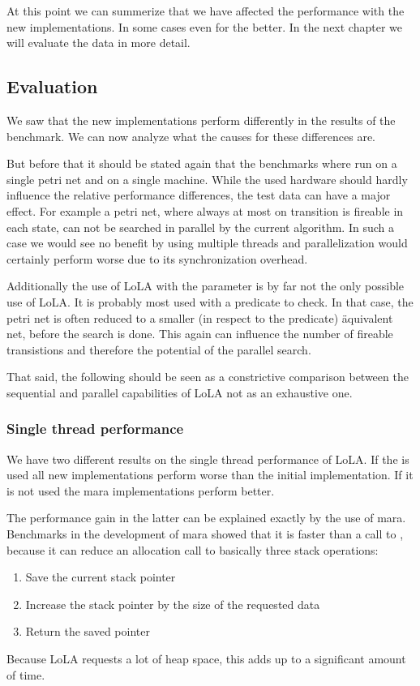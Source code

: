 At this point we can summerize that we have affected the performance with the new implementations. In some cases even for the better. In the next chapter we will evaluate the data in more detail.

\subsection{Evaluation}
\label{evaluation}
We saw that the new implementations perform differently in the results of the benchmark. We can now analyze what the causes for these differences are.

But before that it should be stated again that the benchmarks where run on a single petri net and on a single machine. While the used hardware should hardly influence the relative performance differences, the test data can have a major effect. For example a petri net, where always at most on transition is fireable in each state, can not be searched in parallel by the current algorithm. In such a case we would see no benefit by using multiple threads and parallelization would certainly perform worse due to its synchronization overhead.

Additionally the use of LoLA with the  parameter is by far not the only possible use of LoLA. It is probably most used with a predicate to check. In that case, the petri net is often reduced to a smaller (in respect to the predicate) äquivalent net, before the search is done. This again can influence the number of fireable transistions and therefore the potential of the parallel search.

That said, the following should be seen as a constrictive comparison between the sequential and parallel capabilities of LoLA not as an exhaustive one.

\subsubsection{Single thread performance}
\label{evalSingleThread}
We have two different results on the single thread performance of LoLA. If the  is used all new implementations perform worse than the initial implementation. If it is not used the mara implementations perform better.

The performance gain in the latter can be explained exactly by the use of mara. Benchmarks in the development of mara showed that it is faster than a call to , because it can reduce an allocation call to basically three stack operations:
\begin{enumerate}
    \item Save the current stack pointer
    \item Increase the stack pointer by the size of the requested data
    \item Return the saved pointer
\end{enumerate}
Because LoLA requests a lot of heap space, this adds up to a significant amount of time.

